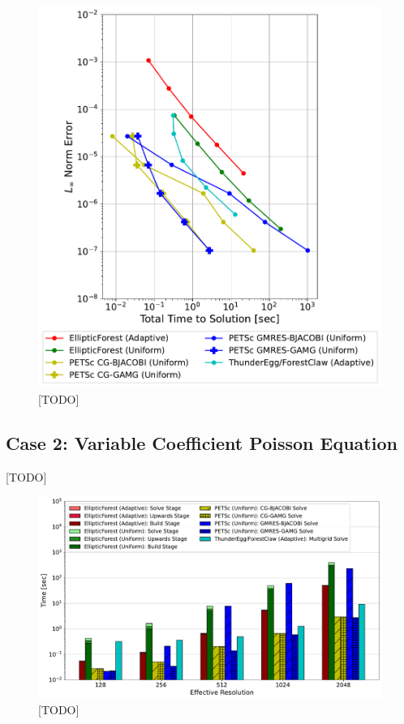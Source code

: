 \begin{figure}
    \centering
    \includegraphics[width=1.0\textwidth, clip=true, trim={0 0 0 0}]{figures/case01-work-precision-plots-no-title.pdf}
    \caption{[TODO]}
    \label{fig:case01-work-precision-plot}
\end{figure}

\subsection{Case 2: Variable Coefficient Poisson Equation}

[TODO]

\begin{landscape}
    \begin{figure}
        \centering
        \includegraphics[width=1.0\textwidth, clip=true, trim={0 0 0 0}]{figures/case02-stacked-bar-plot-comparisons-no-title.pdf}
        \caption{[TODO]}
        \label{fig:case02-stacked-bar-plot}
    \end{figure}
\end{landscape}

